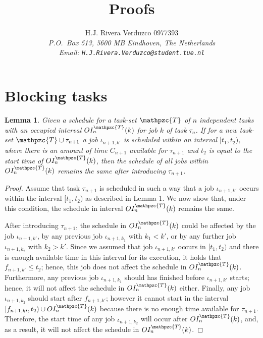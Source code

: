 \documentclass[fleqn]{article}
\title{\sf Proofs}
\author{{\sf H.J. Rivera Verduzco 0977393}\\
{\footnotesize\sl P.O.~Box 513, 5600 MB Eindhoven, The Netherlands}\\
{\footnotesize \sl Email: \tt H.J.Rivera.Verduzco@student.tue.nl}}
\newtheorem{lemma}{Lemma}
\begin{document}
\maketitle


\section{Blocking tasks}

\begin{lemma}
	Given a schedule for a task-set $\mathpzc{T}$ of $n$ independent tasks with an \textit{occupied interval} $OI^{\mathpzc{T}}_n (k)$ for job $k$ of task $\tau_n$. If for a new task-set $\mathpzc{T} \cup \tau_{n+1}$ a job $\iota_{n+1, k\prime}$ is scheduled within an interval $[t_1,t_2)$, where there is an amount of time $C_{n+1}$ available for $\tau_{n+1}$ and $t_2$ is equal to the start time of $OI^{\mathpzc{T}}_n (k)$, then the schedule of all jobs within $OI^{\mathpzc{T}}_n (k)$ remains the same after introducing $\tau_{n+1}$.
\end{lemma}

\begin{proof}
	Assume that task $\tau_{n+1}$ is scheduled in such a way that a job $\iota_{n+1, k\prime}$ occurs within the interval $[t_1,t_2)$ as described in Lemma 1. We now show that, under this condition, the schedule in interval $OI^{\mathpzc{T}}_n (k)$ remains the same.
	
	After introducing $\tau_{n+1}$, the schedule in $OI^{\mathpzc{T}}_n (k)$ could be affected by the job $\iota_{n+1, k\prime}$, by any previous job $\iota_{n+1, k_1}$ with $k_1 < k\prime$, or by any further job $\iota_{n+1, k_2}$ with $k_2 > k\prime$. Since we assumed that job $\iota_{n+1, k\prime}$ occurs in $[t_1,t_2)$ and there is enough available time in this interval for its execution, it holds that $f_{n+1,k\prime} \leq t_2$; hence, this job does not affect the schedule in $OI^{\mathpzc{T}}_n (k)$. Furthermore, any previous job $\iota_{n+1, k_1}$ should has finished before $\iota_{n+1, k \prime}$ starts; hence, it will not affect the schedule in $OI^{\mathpzc{T}}_n (k)$ either. Finally, any job $\iota_{n+1, k_2}$ should start after $f_{n+1,k\prime}$; however it cannot start in the interval $[f_{n+1,k\prime},t_2) \cup OI^{\mathpzc{T}}_n (k)$ because there is no enough time available for $\tau_{n+1}$. Therefore, the start time of any job $\iota_{n+1, k_2}$ will occur after $OI^{\mathpzc{T}}_n (k)$, and, as a result, it will not affect the schedule in $OI^{\mathpzc{T}}_n (k)$.
\end{proof}
\end{document}
